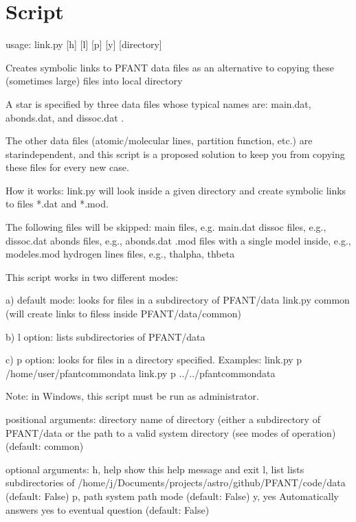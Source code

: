\documentclass[letterpaper,10pt,english]{sphinxmanual}
\begin{document}
\section{Script }
\label{\detokenize{autoscripts/script-link:script-link-py}}\label{\detokenize{autoscripts/script-link::doc}}
\begin{sphinxVerbatim}[commandchars=\\\{\}]
usage: link.py [\PYGZhy{}h] [\PYGZhy{}l] [\PYGZhy{}p] [\PYGZhy{}y] [directory]

Creates symbolic links to PFANT data files as an alternative to copying these (sometimes large) files into local directory

A star is specified by three data files whose typical names are:
main.dat, abonds.dat, and dissoc.dat .

The other data files (atomic/molecular lines, partition function, etc.)
are star\PYGZhy{}independent, and this script is a proposed solution to keep you from
copying these files for every new case.

How it works: link.py will look inside a given directory and create
symbolic links to files *.dat and *.mod.

The following files will be skipped:
  \PYGZhy{} main files, e.g. \PYGZdq{}main.dat\PYGZdq{}
  \PYGZhy{} dissoc files, e.g., \PYGZdq{}dissoc.dat\PYGZdq{}
  \PYGZhy{} abonds files, e.g., \PYGZdq{}abonds.dat\PYGZdq{}
  \PYGZhy{} .mod files with a single model inside, e.g., \PYGZdq{}modeles.mod\PYGZdq{}
  \PYGZhy{} hydrogen lines files, e.g., \PYGZdq{}thalpha\PYGZdq{}, \PYGZdq{}thbeta\PYGZdq{}

This script works in two different modes:

a) default mode: looks for files in a subdirectory of PFANT/data
   \PYGZgt{} link.py common
   (will create links to filess inside PFANT/data/common)

b) \PYGZdq{}\PYGZhy{}l\PYGZdq{} option: lists subdirectories of PFANT/data

c) \PYGZdq{}\PYGZhy{}p\PYGZdq{} option: looks for files in a directory specified.
   Examples:
   \PYGZgt{} link.py \PYGZhy{}p /home/user/pfant\PYGZhy{}common\PYGZhy{}data
   \PYGZgt{} link.py \PYGZhy{}p ../../pfant\PYGZhy{}common\PYGZhy{}data

Note: in Windows, this script must be run as administrator.

positional arguments:
  directory   name of directory (either a subdirectory of PFANT/data or the
              path to a valid system directory (see modes of operation)
              (default: common)

optional arguments:
  \PYGZhy{}h, \PYGZhy{}\PYGZhy{}help  show this help message and exit
  \PYGZhy{}l, \PYGZhy{}\PYGZhy{}list  lists subdirectories of
              /home/j/Documents/projects/astro/github/PFANT/code/data
              (default: False)
  \PYGZhy{}p, \PYGZhy{}\PYGZhy{}path  system path mode (default: False)
  \PYGZhy{}y, \PYGZhy{}\PYGZhy{}yes   Automatically answers \PYGZsq{}yes\PYGZsq{} to eventual question (default:
              False)
\end{sphinxVerbatim}
\end{document}
